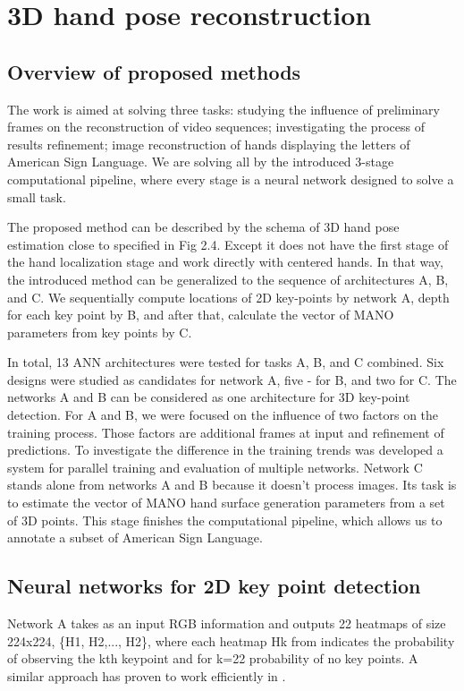 \chapter{3D hand pose reconstruction}

\section{Overview of proposed methods}

The work is aimed at solving three tasks: studying the influence of preliminary frames on the reconstruction of video sequences; investigating the process of results refinement; image reconstruction of hands displaying the letters of American Sign Language. We are solving all by the introduced 3-stage computational pipeline, where every stage is a neural network designed to solve a small task.

The proposed method can be described by the schema of 3D hand pose estimation close to specified in Fig 2.4. Except it does not have the first stage of the hand localization stage and work directly with centered hands. In that way, the introduced method can be generalized to the sequence of architectures A, B, and C. We sequentially compute locations of 2D key-points by network A, depth for each key point by B, and after that, calculate the vector of MANO parameters from key points by C. 

In total, 13 ANN architectures were tested for tasks A, B, and C combined. Six designs were studied as candidates for network A, five - for B, and two for C. The networks A and B can be considered as one architecture for 3D key-point detection. For A and B, we were focused on the influence of two factors on the training process. Those factors are additional frames at input and refinement of predictions. To investigate the difference in the training trends was developed a system for parallel training and evaluation of multiple networks. Network C stands alone from networks A and B because it doesn't process images. Its task is to estimate the vector of MANO hand surface generation parameters from a set of 3D points. This stage finishes the computational pipeline, which allows us to annotate a subset of American Sign Language.

\section{Neural networks for 2D key point detection}

Network A takes as an input RGB information and outputs 22 heatmaps of size 224x224, \{H1, H2,..., H2\}, where each heatmap Hk from indicates the probability of observing the kth keypoint and for k=22 probability of no key points. A similar approach has proven to work efficiently in \cite{PCP}.

